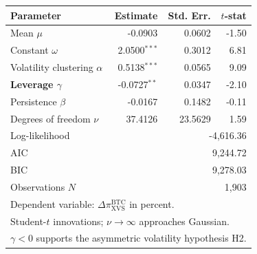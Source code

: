 \begin{tabular}{lrrr}
\toprule
Parameter & Estimate & Std. Err. & $t$-stat \\
\midrule
Mean $\mu$ & -0.0903 & 0.0602 & -1.50 \\
Constant $\omega$ & 2.0500$^{***}$ & 0.3012 & 6.81 \\
Volatility clustering $\alpha$ & 0.5138$^{***}$ & 0.0565 & 9.09 \\
\textbf{Leverage $\gamma$} & -0.0727$^{**}$ & 0.0347 & -2.10 \\
Persistence $\beta$ & -0.0167 & 0.1482 & -0.11 \\
Degrees of freedom $\nu$ & 37.4126 & 23.5629 & 1.59 \\
\midrule
Log-likelihood & \multicolumn{3}{r}{-4,616.36} \\
AIC & \multicolumn{3}{r}{9,244.72} \\
BIC & \multicolumn{3}{r}{9,278.03} \\
Observations $N$ & \multicolumn{3}{r}{1,903} \\
\bottomrule
\multicolumn{4}{l}{\footnotesize Dependent variable: $\Delta\pi^{\text{BTC}}_{\text{XVS}}$ in percent.}\\
\multicolumn{4}{l}{\footnotesize Student-$t$ innovations; $\nu \to \infty$ approaches Gaussian.}\\
\multicolumn{4}{l}{\footnotesize $\gamma<0$ supports the asymmetric volatility hypothesis H2.}\\
\end{tabular}